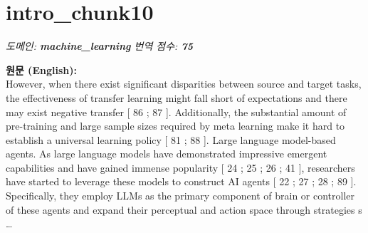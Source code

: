 \documentclass[12pt,a4paper]{article}
\begin{document}
\section{intro\_chunk10}
\noindent\textit{\small 도메인: \textbf{machine\_learning} \quad 번역 점수: \textbf{\color{orange!80!black}75}}
\vspace{0.5em}

\begin{mdframed}[style=orig]
\noindent\textbf{\small 원문 (English):}\\[2pt]
\small However, when there exist significant disparities between source and target tasks, the effectiveness of transfer learning might fall short of expectations and there may exist negative transfer [ 86 ; 87 ]. Additionally, the substantial amount of pre-training and large sample sizes required by meta learning make it hard to establish a universal learning policy [ 81 ; 88 ]. Large language model-based agents. As large language models have demonstrated impressive emergent capabilities and have gained immense popularity [ 24 ; 25 ; 26 ; 41 ], researchers have started to leverage these models to construct AI agents [ 22 ; 27 ; 28 ; 89 ]. Specifically, they employ LLMs as the primary component of brain or controller of these agents and expand their perceptual and action space through strategies s \ldots
\end{mdframed}
\vspace{0.4em}
\end{document}
